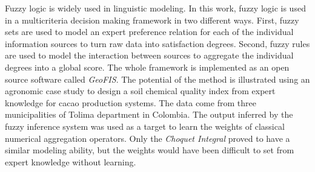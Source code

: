 
  Fuzzy logic is widely used in linguistic modeling. In this work, fuzzy logic is used in a multicriteria decision making framework in two different ways. First, fuzzy sets are used to model an expert preference relation for each of the individual information sources to turn raw data into satisfaction degrees. Second, fuzzy rules are used to model the interaction between sources to aggregate the individual degrees into a global score. The whole framework is implemented as an open source software called \textit{GeoFIS}. The potential of the method is illustrated using an agronomic case study to design a soil chemical quality index from expert knowledge for cacao production systems. The data come from three municipalities of Tolima department in Colombia. The output inferred by the fuzzy inference system was used as a target to learn the weights of classical numerical aggregation operators. Only the \textit{Choquet Integral} proved to have a similar modeling ability, but the weights would have been difficult to set from expert knowledge without learning.
  

